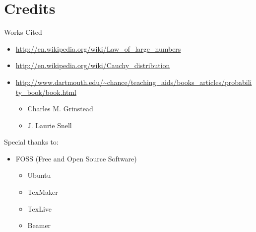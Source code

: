 \documentclass[9pt]{beamer}
\begin{document}
\section{Credits}

\begin{frame}{Works Cited}

\begin{itemize}
\item \url{http://en.wikipedia.org/wiki/Law_of_large_numbers}
\item \url{http://en.wikipedia.org/wiki/Cauchy_distribution}
\item \url{http://www.dartmouth.edu/~chance/teaching_aids/books_articles/probability_book/book.html}
\begin{itemize}
\item Charles M. Grinstead
\item J. Laurie Snell
\end{itemize}
\end{itemize}

\end{frame}

\begin{frame}{Special thanks to:}

\begin{itemize}

\item FOSS (Free and Open Source Software)
\begin{itemize}
\item Ubuntu
\item TexMaker
\item TexLive
\item Beamer 
\end{itemize}

\end{itemize}

\end{frame}
\end{document}
